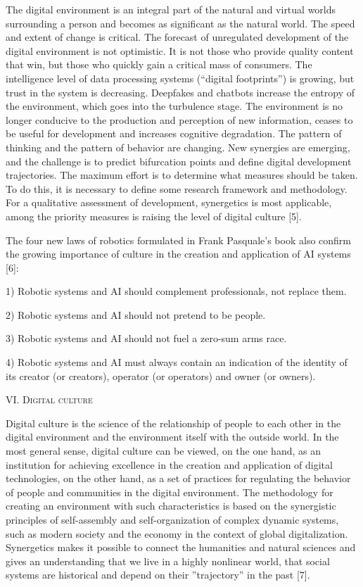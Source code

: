 \documentclass{article}
\begin{document}
\begin{multicols}{2}
The digital environment is an integral part of the
natural and virtual worlds surrounding a person and becomes as significant as the natural world. The speed and
extent of change is critical. The forecast of unregulated
development of the digital environment is not optimistic.
It is not those who provide quality content that win, but
those who quickly gain a critical mass of consumers. The
intelligence level of data processing systems (“digital
footprints”) is growing, but trust in the system is decreasing. Deepfakes and chatbots increase the entropy of the
environment, which goes into the turbulence stage. The
environment is no longer conducive to the production
and perception of new information, ceases to be useful
for development and increases cognitive degradation. The
pattern of thinking and the pattern of behavior are changing. New synergies are emerging, and the challenge is to
predict bifurcation points and define digital development
trajectories. The maximum effort is to determine what
measures should be taken. To do this, it is necessary to
define some research framework and methodology. For
a qualitative assessment of development, synergetics is
most applicable, among the priority measures is raising
the level of digital culture [5].

The four new laws of robotics formulated in Frank
Pasquale’s book also confirm the growing importance of
culture in the creation and application of AI systems [6]:

1) Robotic systems and AI should complement professionals, not replace them.

2) Robotic systems and AI should not pretend to be
people.

3) Robotic systems and AI should not fuel a zero-sum
arms race.

4) Robotic systems and AI must always contain an
indication of the identity of its creator (or creators),
operator (or operators) and owner (or owners).
\begin{center}
\vspace{-5pt}
    \large{\textsc{VI. Digital culture}}
 \vspace{-5pt}  
\end{center}

Digital culture is the science of the relationship of
people to each other in the digital environment and the
environment itself with the outside world. In the most
general sense, digital culture can be viewed, on the one
hand, as an institution for achieving excellence in the
creation and application of digital technologies, on the
other hand, as a set of practices for regulating the behavior of people and communities in the digital environment.
The methodology for creating an environment with such
characteristics is based on the synergistic principles of
self-assembly and self-organization of complex dynamic
systems, such as modern society and the economy in
the context of global digitalization. Synergetics makes it
possible to connect the humanities and natural sciences
and gives an understanding that we live in a highly nonlinear world, that social systems are historical and depend
on their ”trajectory” in the past [7].


\end{multicols}
\end{document}
